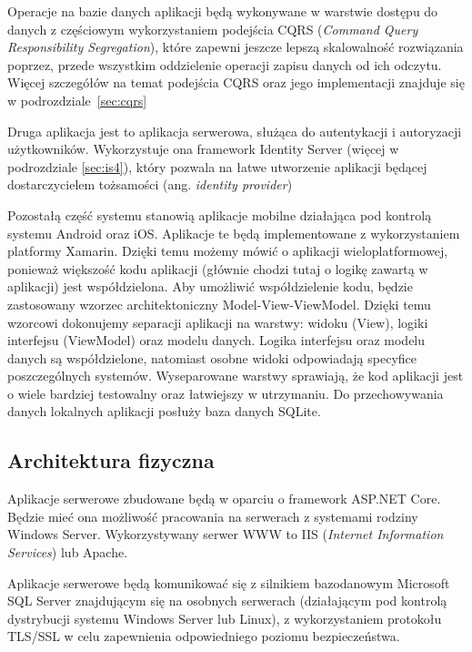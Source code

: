 \par Operacje na bazie danych aplikacji będą wykonywane w warstwie dostępu do danych z częściowym wykorzystaniem podejścia CQRS (\textit{Command Query Responsibility Segregation}), które zapewni jeszcze lepszą skalowalność rozwiązania poprzez, przede wszystkim oddzielenie operacji zapisu danych od ich odczytu. Więcej szczegółów na temat podejścia CQRS oraz jego implementacji znajduje się w podrozdziale~\ref{sec:cqrs}

\par Druga aplikacja jest to aplikacja serwerowa, służąca do autentykacji i autoryzacji użytkowników. Wykorzystuje ona framework Identity Server (więcej w podrozdziale \ref{sec:is4}), który pozwala na łatwe utworzenie aplikacji będącej dostarczycielem tożsamości (ang. \textit{identity provider})

\par Pozostałą część systemu stanowią aplikacje mobilne działająca pod kontrolą systemu Android oraz iOS. Aplikacje te będą implementowane z wykorzystaniem platformy Xamarin. Dzięki temu możemy mówić o aplikacji wieloplatformowej, ponieważ większość kodu aplikacji (głównie chodzi tutaj o logikę zawartą w aplikacji) jest współdzielona. Aby umożliwić współdzielenie kodu, będzie zastosowany wzorzec architektoniczny Model-View-ViewModel. Dzięki temu wzorcowi dokonujemy separacji aplikacji na warstwy: widoku (View), logiki interfejsu (ViewModel) oraz modelu danych. Logika interfejsu oraz modelu danych są współdzielone, natomiast osobne widoki odpowiadają specyfice poszczególnych systemów. Wyseparowane warstwy sprawiają, że kod aplikacji jest o wiele bardziej testowalny oraz łatwiejszy w utrzymaniu. Do przechowywania danych lokalnych aplikacji posłuży baza danych SQLite.
\newpage
\subsection*{Architektura fizyczna}
\label{fizy}
Aplikacje serwerowe zbudowane będą w oparciu o framework ASP.NET Core. Będzie mieć ona możliwość pracowania na serwerach z systemami rodziny Windows Server. Wykorzystywany serwer WWW to IIS (\textit{Internet Information Services}) lub Apache.

\par Aplikacje serwerowe będą komunikować się z silnikiem bazodanowym Microsoft SQL Server znajdującym się na osobnych serwerach (działającym pod kontrolą dystrybucji systemu Windows Server lub Linux), z wykorzystaniem protokołu TLS/SSL w celu zapewnienia odpowiedniego poziomu bezpieczeństwa.

